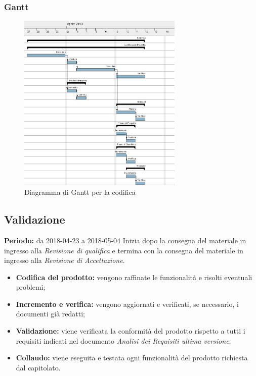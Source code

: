 \subsubsection{Gantt}
\begin{figure}[H]
	\centering 
	\includegraphics[width=0.7\textwidth]{images/Codifica.png}
	\caption{Diagramma di Gantt per la codifica}
	\label{graficobello5} 
\end{figure}
\subsection{Validazione}
    \textbf{Periodo:} da 2018-04-23 a 2018-05-04\Spazio
    Inizia dopo la consegna del materiale in ingresso alla \emph{Revisione di qualifica} e termina con la consegna del materiale in ingresso alla \emph{Revisione di Accettazione}.
    \begin{itemize}
    	\item \textbf{Codifica del prodotto:} vengono raffinate le funzionalità e risolti eventuali problemi;
    	\item \textbf{Incremento e verifica:} vengono aggiornati e verificati, se necessario, i documenti già redatti; 
    	\item \textbf{Validazione:} viene verificata la conformità del prodotto rispetto a tutti i requisiti indicati nel documento \emph{Analisi dei Requisiti ultima versione};
    	\item \textbf{Collaudo:} viene eseguita e testata ogni funzionalità del prodotto richiesta dal capitolato.
    \end{itemize}
